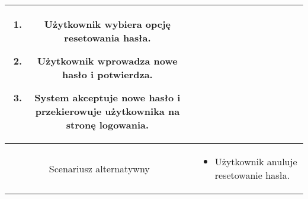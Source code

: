 \documentclass{article}
\begin{document}
\begin{enumerate}
\begin{enumerate}
\begin{table}[H]
\begin{tabular}{|c|p{7cm}|}
\begin{enumerate}
\item Użytkownik wybiera opcję resetowania hasła.

\item Użytkownik wprowadza nowe hasło i potwierdza.

\item System akceptuje nowe hasło i przekierowuje użytkownika na stronę logowania.\end{enumerate} \\
						\hline
						Scenariusz alternatywny & \begin{itemize}\item Użytkownik anuluje resetowanie hasła.\end{itemize}                                                                                                                                                                                       \\
						\hline
					\end{tabular}
				\end{table}


\end{enumerate}
\end{enumerate}
\end{document}
